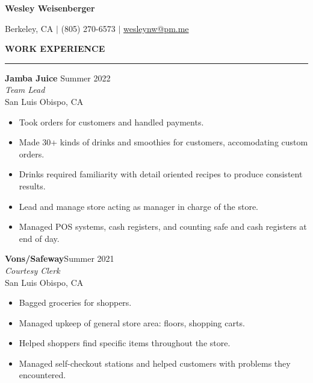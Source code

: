 \documentclass[12pt]{article}
\begin{document}

    \newcommand{\header}[1]{ 
        \vspace{4mm}
        {\large \noindent \textbf{#1}}
        \vspace{2mm}
        \hrule
        \vspace{3mm}
    }

    \begin{center}
        
        {\LARGE \textbf{Wesley Weisenberger}}
    
        \vspace{2mm}

        {\large Berkeley, CA  $\mid$ (805) 270-6573 
            $\mid$
            \href{mailto:wesleynw@pm.me}{wesleynw@pm.me}

        }

    \end{center}


    \header{WORK EXPERIENCE}

    \begin{adjustwidth}{1em}{1em}


    \textbf{Jamba Juice} \hfill Summer 2022
    \\\textit{Team Lead}
    \\San Luis Obispo, CA
    \begin{itemize}
        \item Took orders for customers and handled payments.
        \item Made 30+ kinds of drinks and smoothies for customers, accomodating custom orders.
        \item Drinks required familiarity with detail oriented recipes to produce consistent results.
        \item Lead and manage store acting as manager in charge of the store.
        \item Managed POS systems, cash registers, and counting safe and cash registers at end of day.
    \end{itemize}

    \vspace{7mm}

    \textbf{Vons/Safeway}\hfill Summer 2021
    \\ \textit{Courtesy Clerk} 
    \\San Luis Obispo, CA
    \begin{itemize}
        \item Bagged groceries for shoppers.
        \item Managed upkeep of general store area: floors, shopping carts.
        \item Helped shoppers find specific items throughout the store.
        \item Managed self-checkout stations and helped customers with problems they encountered.
    \end{itemize}
        
    \end{adjustwidth}
\end{document}

